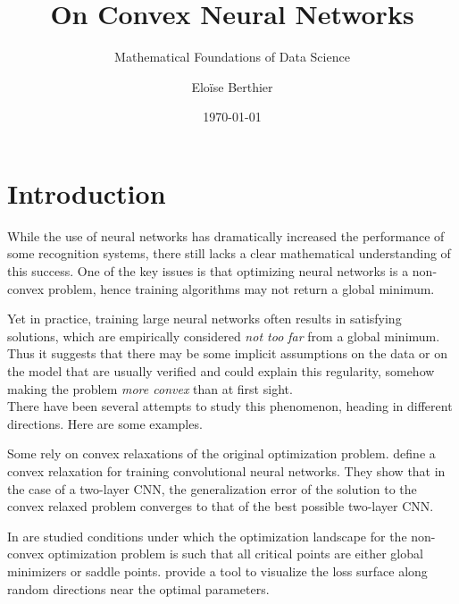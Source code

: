 \documentclass[a4paper, 11pt]{scrartcl}
\title{On Convex Neural Networks}
\author{Eloïse Berthier}
\date{\today}
\subtitle{Mathematical Foundations of Data Science}
\begin{document}
\setcounter{secnumdepth}{3}
\setlength{\parindent}{0cm}

\maketitle

\everymath{\displaystyle}


\newpage

\section{Introduction}

While the use of neural networks has dramatically increased the performance of some recognition systems, there still lacks a clear mathematical understanding of this success. One of the key issues is that optimizing neural networks is a non-convex problem, hence training algorithms may not return a global minimum.

Yet in practice, training large neural networks often results in satisfying solutions, which are empirically considered \textit{not too far} from a global minimum. Thus it suggests that there may be some implicit assumptions on the data or on the model that are usually verified and could explain this regularity, somehow making the problem \textit{more convex} than at first sight.\\

There have been several attempts to study this phenomenon, heading in different directions. Here are some examples.

Some rely on convex relaxations of the original optimization problem. \cite{zhang2016convexified} define a convex relaxation for training convolutional neural networks. They show that in the case of a two-layer CNN, the generalization error of the solution to the convex relaxed problem converges to that of the best possible two-layer CNN.

In \cite{haeffele2017global} are studied conditions under which the optimization landscape for the non-convex optimization problem is such that all critical points are either global minimizers or saddle points. \cite{visualloss} provide a tool to visualize the loss surface along random directions near the optimal parameters.
\end{document}
